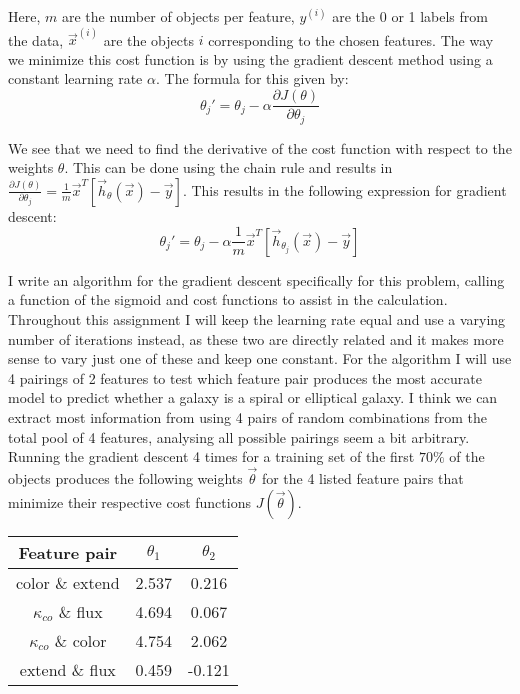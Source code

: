 Here, $m$ are the number of objects per feature, $y^{(i)}$ are the 0 or 1 labels from the data, $\vec{x}^{(i)}$ are the objects $i$ corresponding to the chosen features. The way we minimize this cost function is by using the gradient descent method using a constant learning rate $\alpha$. The formula for this given by:\\

\begin{equation}
\theta_{j}' = \theta_j - \alpha \frac{\partial J(\theta)}{\partial \theta_j}
\end{equation}

We see that we need to find the derivative of the cost function with respect to the weights $\theta$. This can be done using the chain rule and results in $\frac{\partial J(\theta)}{\partial \theta_j} = \frac{1}{m} \vec{x}^T [\vec{h}_{\theta}(\vec{x}) - \vec{y}]$. This results in the following expression for gradient descent:\\

\begin{equation}
\theta_{j}' = \theta_j - \alpha \frac{1}{m} \vec{x}^T [\vec{h}_{\theta_j}(\vec{x}) - \vec{y}]
\end{equation}

I write an algorithm for the gradient descent specifically for this problem, calling a function of the sigmoid and cost functions to assist in the calculation. Throughout this assignment I will keep the learning rate equal and use a varying number of iterations instead, as these two are directly related and it makes more sense to vary just one of these and keep one constant. For the algorithm I will use 4 pairings of 2 features to test which feature pair produces the most accurate model to predict whether a galaxy is a spiral or elliptical galaxy. I think we can extract most information from using 4 pairs of random combinations from the total pool of 4 features, analysing all possible pairings seem a bit arbitrary. Running the gradient descent 4 times for a training set of the first $70\%$ of the objects produces the following weights $\vec{\theta}$ for the 4 listed feature pairs that minimize their respective cost functions $J(\vec{\theta})$. 

\begin{table}[!h]
\centering
\begin{tabular}{c|c|c}
\textbf{Feature pair} & $\theta_1$ & $\theta_2$\\ \hline 
color \& extend &   2.537       &     0.216\\ \hline 
$\kappa_{co}$ \& flux &     4.694      &      0.067\\ \hline 
$\kappa_{co}$ \& color &     4.754      &     2.062\\ \hline
extend \& flux &     0.459     &      -0.121
\end{tabular}
\end{table}

